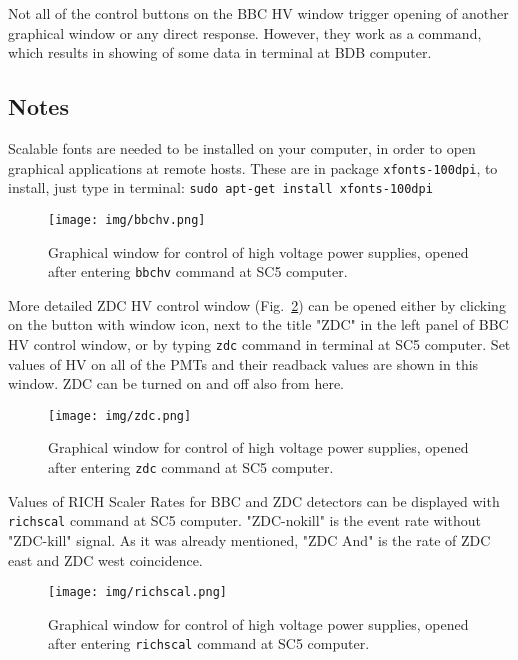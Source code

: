 Not all of the control buttons on the BBC HV window trigger opening of another graphical window or any direct response. However, they work as a command, which results in showing of some data in terminal at BDB computer.

\subsection{Notes}
Scalable fonts are needed to be installed on your computer, in order to open graphical applications at remote hosts.
These are in package \texttt{xfonts-100dpi}, to install, just type in terminal: \texttt{sudo apt-get install xfonts-100dpi}
 
\begin{figure}[htb]
  \begin{center}
    \texttt{[image: img/bbchv.png]}
  \end{center}
  \caption{Graphical window for control of high voltage power supplies, opened after entering \texttt{bbchv} command at SC5 computer.}
\label{bbchv}
\end{figure}

More detailed ZDC HV control window (Fig.~\ref{zdcwindow}) can be opened either by clicking on the button with window icon, next to the title "ZDC" in the left panel of BBC HV control window, or by typing \texttt{zdc} command in terminal at SC5 computer. Set values of HV on all of the PMTs and their readback values are shown in this window.  ZDC can be turned on and off also from here.

\begin{figure}[htb]
  \begin{center}
    \texttt{[image: img/zdc.png]}
  \end{center}
  \caption{Graphical window for control of high voltage power supplies, opened after entering \texttt{zdc} command at SC5 computer.}
\label{zdcwindow}
\end{figure}

Values of RICH Scaler Rates for BBC and ZDC detectors can be displayed with \texttt{richscal} command at SC5 computer. "ZDC-nokill" is the event rate without "ZDC-kill" signal. As it was already mentioned, "ZDC And" is the rate of ZDC east and ZDC west coincidence.

\begin{figure}[htb]
  \begin{center}
    \texttt{[image: img/richscal.png]}
  \end{center}
  \caption{Graphical window for control of high voltage power supplies, opened after entering \texttt{richscal} command at SC5 computer.}
\label{richscal}
\end{figure}

